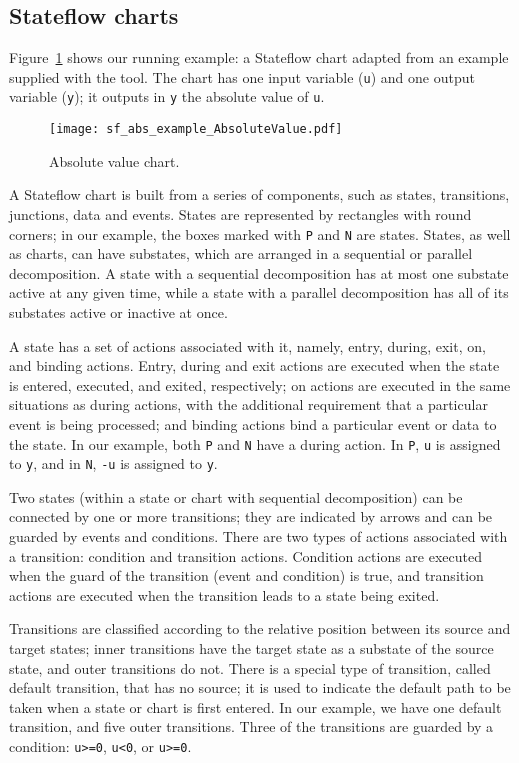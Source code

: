 \documentclass[submission]{eptcs}
\begin{document}
\subsection{Stateflow charts}

Figure~\ref{fig:example} shows our running example: a Stateflow chart adapted from an example supplied with the tool.
The chart has one input variable (\texttt{u}) and one output variable (\texttt{y}); it outputs in \texttt{y} the absolute value of \texttt{u}.

\begin{figure}
\centering
\texttt{[image: sf\_abs\_example\_AbsoluteValue.pdf]}
\caption{Absolute value chart.}
\label{fig:example}
\end{figure}

A Stateflow chart is built from a series of components, such as states, transitions, junctions, data and events.
States are represented by rectangles with round corners; in our example, the boxes marked with \texttt{P} and \texttt{N} are states. States, as well as charts, can have substates, which are arranged in a sequential or parallel decomposition. A state with a sequential decomposition has at most one substate active at any given time, while a state with a parallel decomposition has all of its substates active or inactive at once.

A state has a set of actions associated with it, namely, entry, during, exit, on, and binding actions. Entry, during and exit actions are executed when the state is entered, executed, and exited, respectively; on actions are executed in the same situations as during actions, with the additional requirement that a particular event is being processed; and binding actions bind a particular event or data to the state. In our example, both \texttt{P} and \texttt{N} have a during action. In \texttt{P}, \texttt{u} is assigned to \texttt{y}, and in \texttt{N}, \texttt{-u} is assigned to \texttt{y}.

Two states (within a state or chart with sequential decomposition) can be connected by one or more transitions; they are indicated by arrows and can be guarded by events and conditions. There are two types of actions associated with a transition: condition and transition actions. Condition actions are executed when the guard of the transition (event and condition) is true, and transition actions are executed when the transition leads to a state being exited.

Transitions are classified according to the relative position between its source and target states; inner transitions have the target state as a substate of the source state, and outer transitions do not. There is a special type of transition, called default transition, that has no source; it is used to indicate the default path to be taken when a state or chart is first entered. In our example, we have one default transition, and five outer transitions. Three of the transitions are guarded by a condition: \texttt{u>=0}, \texttt{u<0}, or \texttt{u>=0}.
\end{document}
